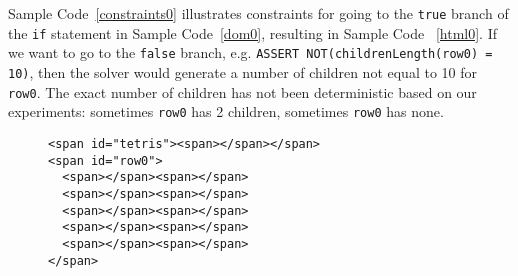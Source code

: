 Sample Code~\ref{constraints0} illustrates constraints for going to the {\tt true} branch of the {\tt if} statement in Sample Code~\ref{dom0}, resulting in Sample Code ~\ref{html0}.  
If we want to go to the {\tt false} branch, e.g. {\tt ASSERT NOT(childrenLength(row0) = 10)}, then the solver would generate a number of children not equal to 10 for {\tt row0}.  The exact number of children has not been deterministic based on our experiments: sometimes {\tt row0} has 2 children, sometimes {\tt row0} has none.  

\begin{figure}
\begin{lstlisting}[caption=Example HTML generated by the DOM solver based on the constraints defined in Sample Code ~\ref{constraints0}.  Note that {\tt row0} is not a child of {\tt tetris} because the source code in Sample Code \ref{dom0} did not require the rows to be children of {\tt tetris}.,label=html0]  
<span id="tetris"><span></span></span>
<span id="row0">
  <span></span><span></span>
  <span></span><span></span>
  <span></span><span></span>
  <span></span><span></span>
  <span></span><span></span>
</span>
\end{lstlisting}
\end{figure}
